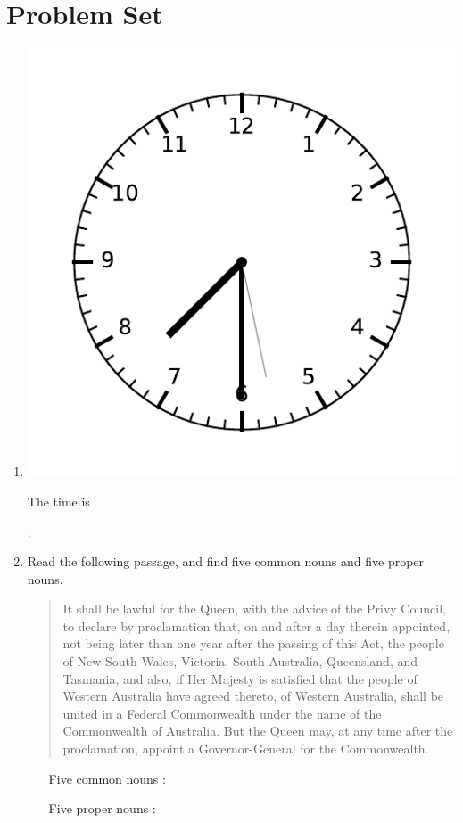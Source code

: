 \documentclass{tufte-book}
\begin{document}
\clearpage\section{Problem Set }

\begin{enumerate}
  \item \begin{marginfigure}\includegraphics[width=\textwidth]{maths/fig/clock_0730.pdf}\end{marginfigure}
  The time is \dotfill\bigskip\par\dotfill\bigskip.\par

  \item Read the following passage, and find five common nouns and five proper nouns.
  \begin{quote}
    It shall be lawful for the Queen, with the advice of the Privy Council, to declare by proclamation that,
    on and after a day therein appointed, not being later than one year after the passing of this Act,
    the people of New South Wales, Victoria, South Australia, Queensland, and Tasmania, and also,
    if Her Majesty is satisfied that the people of Western Australia have agreed thereto, of Western Australia,
    shall be united in a Federal Commonwealth under the name of the Commonwealth of Australia.
    But the Queen may, at any time after the proclamation, appoint a Governor-General for the Commonwealth.
  \end{quote}
  \begin{itemize}
    \item[Five common nouns]: \dotfill\bigskip\par\dotfill\bigskip\par\dotfill\bigskip
    \item[Five proper nouns]: \dotfill\bigskip\par\dotfill\bigskip\par\dotfill\bigskip
  \end{itemize}


\end{enumerate}
\end{document}
